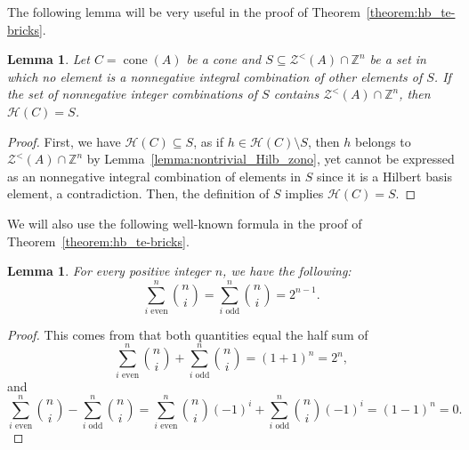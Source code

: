 \documentclass[11pt,a4paper]{amsart}
\theoremstyle{plain}
\newtheorem{lemma}[theorem]{Lemma}
\theoremstyle{definition}
\newcommand{\cal}[1]{\mathcal{#1}}
\newcommand{\Z}{\mathbb{Z}}
\DeclareMathOperator{\cone}{cone}
\renewcommand{\cal}[1]{\mathcal{#1}}
\begin{document}
The following lemma will be very useful in the proof of Theorem~\ref{theorem:hb_te-bricks}.			
\begin{lemma}\label{lemma:finding_hilbert_basis}
Let $C = \cone (A)$ be a cone and $S\subseteq \cal{Z}^<(A) \cap \Z^n$ be a set in which no element is a nonnegative integral combination of other elements of $S$.
If the set of nonnegative integer combinations of $S$ contains $\cal{Z}^<(A)\cap \Z^n$, then $\cal{H}(C)=S$.
\end{lemma}
\begin{proof}
First, we have $\cal{H}(C)\subseteq S$, as if $h\in\cal{H}(C)\setminus S$, then $h$ belongs to $\cal{Z}^<(A)\cap\Z^n$ by Lemma~\ref{lemma:nontrivial_Hilb_zono}, yet cannot be expressed as an nonnegative integral combination of elements in $S$ since it is a Hilbert basis element, a contradiction.
Then, the definition of $S$ implies $\cal{H}(C)=S$.
\end{proof}

We will also use the following well-known formula in the proof of Theorem~\ref{theorem:hb_te-bricks}.
\begin{lemma}\label{lemma:odd_and_even_sum}
For every positive integer $n$, we have the following:
$$\sum_{i\text{ even}}^{n} \binom{n}{i} = \sum_{i\text{ odd}}^{n}\binom{n}{i} = 2^{n-1}.$$
\end{lemma}
\begin{proof}
This comes from that both quantities equal the half sum of
$$\sum_{i\text{ even}}^{n} \binom{n}{i} + \sum_{i\text{ odd}}^{n}\binom{n}{i} = (1+1)^n= 2^n,$$
and
$$\sum_{i\text{ even}}^{n} \binom{n}{i} -  \sum_{i\text{ odd}}^{n} \binom{n}{i} = \sum_{i\text{ even}}^{n} \binom{n}{i}(-1)^i + \sum_{i\text{ odd}}^{n} \binom{n}{i}(-1)^i = (1-1)^n= 0.$$
\end{proof}
\end{document}
